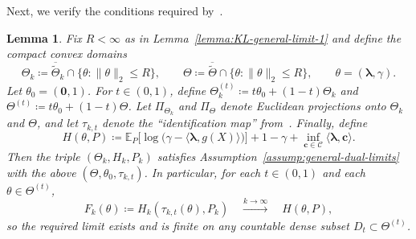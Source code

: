 \documentclass{article}
\theoremstyle{plain}
\newtheorem{lemma}[lemma]{Lemma}
\theoremstyle{definition}
\newcommand{\calC}{\mathcal C}
\newcommand{\cvec}{\mathbf{c}}
\newcommand{\boldlambda}{\boldsymbol{\lambda}}
\begin{document}
Next, we verify the conditions required by~. 
\begin{lemma}\label{lemma:KL-general-limit-B5}
Fix $R<\infty$ as in Lemma~\ref{lemma:KL-general-limit-1} and define the compact convex domains
\[
\Theta_k \coloneqq  \overline{\widetilde\Theta}_k\cap\{\theta:\|\theta\|_2\leq R\},
\qquad
\Theta \coloneqq  \overline{\widetilde\Theta}\cap\{\theta:\|\theta\|_2\leq R\},
\qquad \theta=(\boldlambda,\gamma).
\]
Let $\theta_0=(\boldsymbol{0},1)$. For $t\in(0,1)$, define $\Theta_k^{(t)}\coloneqq t\theta_0+(1-t)\Theta_k$ and
$\Theta^{(t)}\coloneqq t\theta_0+(1-t)\Theta$. Let $\Pi_{\Theta_k}$ and $\Pi_\Theta$ denote Euclidean projections onto $\Theta_k$ and $\Theta$,
and let $\tau_{k,t}$ denote the ``identification map'' from~. 
Finally, define
\[
H(\theta,P)\coloneqq \mathbb{E}_P\!\Big[\log\big(\gamma-\langle \boldlambda,g(X)\rangle\big)\Big]+1-\gamma+\inf_{\cvec\in\calC}\langle \boldlambda,\cvec\rangle.
\]
Then the triple $(\Theta_k,H_k,P_k)$ satisfies Assumption~\ref{assump:general-dual-limits} with the above $(\Theta,\theta_0,\tau_{k,t})$.
In particular, for each $t\in(0,1)$ and each $\theta\in\Theta^{(t)}$,
\[
F_k(\theta) \coloneqq H_k(\tau_{k,t}(\theta),P_k) \quad \overset{k \to \infty}{\longrightarrow}\quad H(\theta,P),
\]
so the required limit exists and is finite on any countable dense subset $D_t\subset\Theta^{(t)}$.
\end{lemma}
\end{document}
